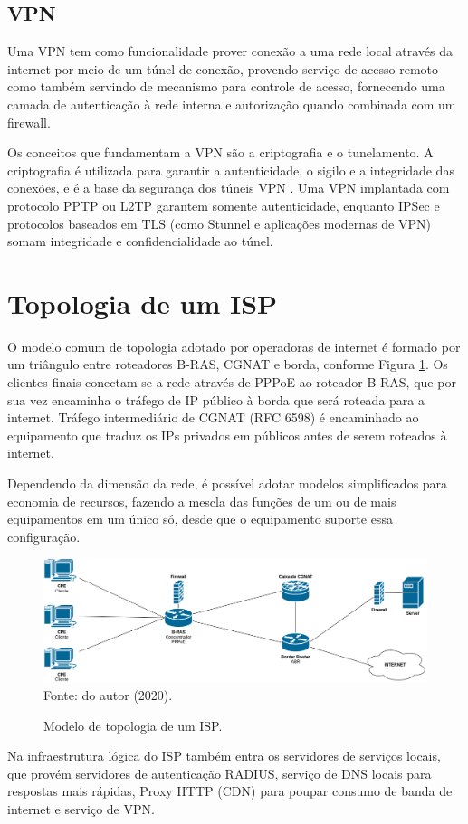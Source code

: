\subsection{VPN}

    Uma VPN tem como funcionalidade prover conexão a uma rede local através da internet por meio de um túnel de conexão, provendo serviço de acesso remoto como também servindo de mecanismo para controle de acesso, fornecendo uma camada de autenticação à rede interna e autorização quando combinada com um firewall.
    
    Os conceitos que fundamentam a VPN são a criptografia e o tunelamento. A criptografia é utilizada para garantir a autenticidade, o sigilo e a integridade das conexões, e é a base da segurança dos túneis VPN \cite{nakamura2007}. Uma VPN implantada com protocolo PPTP ou L2TP garantem somente autenticidade, enquanto IPSec e protocolos baseados em TLS (como Stunnel e aplicações modernas de VPN) somam integridade e confidencialidade ao túnel.

\section{Topologia de um ISP}
    O modelo comum de topologia adotado por operadoras de internet é formado por um triângulo entre roteadores B-RAS, CGNAT e borda, conforme Figura \ref{fig:isp}. Os clientes finais conectam-se a rede através de PPPoE ao roteador B-RAS, que por sua vez encaminha o tráfego de IP público à borda que será roteada para a internet. Tráfego intermediário de CGNAT (RFC 6598) é encaminhado ao equipamento que traduz os IPs privados em públicos antes de serem roteados à internet.
    
    Dependendo da dimensão da rede, é possível adotar modelos simplificados para economia de recursos, fazendo a mescla das funções de um ou de mais equipamentos em um único só, desde que o equipamento suporte essa configuração.
    
    \begin{figure}[!htb]
        \centering
        \caption{Modelo de topologia de um ISP.} 
        \label{fig:isp} 
        \includegraphics[width=0.9\linewidth]{img/isp.png} \\
        {\small Fonte: do autor (2020).} 
    \end{figure}
    
    Na infraestrutura lógica do ISP também entra os servidores de serviços locais, que provém servidores de autenticação RADIUS, serviço de DNS locais para respostas mais rápidas, Proxy HTTP (CDN) para poupar consumo de banda de internet e serviço de VPN.